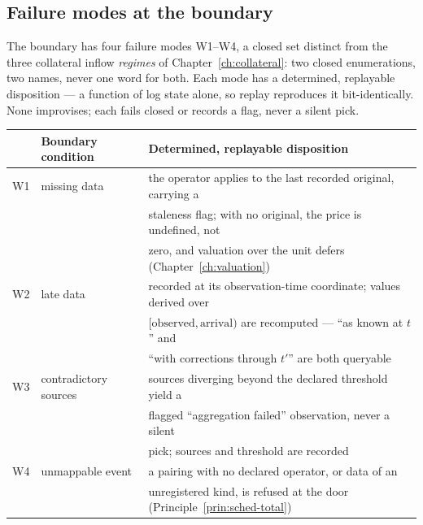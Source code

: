 \subsection{Failure modes at the boundary}\label{sec:failures}

The boundary has four failure modes W1--W4, a closed set distinct from the three collateral
inflow \emph{regimes} of Chapter~\ref{ch:collateral}: two closed enumerations, two names, never
one word for both. Each mode has a determined, replayable disposition --- a
function of log state alone, so replay reproduces it bit-identically. None improvises; each
fails closed or records a flag, never a silent pick.

\begin{center}
\begin{tabular}{@{}lll@{}}
\toprule
 & Boundary condition & Determined, replayable disposition \\
\midrule
W1 & missing data & the operator applies to the last recorded original, carrying a \\
   &               & staleness flag; with no original, the price is undefined, not \\
   &               & zero, and valuation over the unit defers (Chapter~\ref{ch:valuation}) \\
W2 & late data & recorded at its observation-time coordinate; values derived over \\
   &            & $[\text{observed},\text{arrival})$ are recomputed --- ``as known at $t$'' and \\
   &            & ``with corrections through $t'$'' are both queryable \\
W3 & contradictory sources & sources diverging beyond the declared threshold yield a \\
   &                       & flagged ``aggregation failed'' observation, never a silent \\
   &                       & pick; sources and threshold are recorded \\
W4 & unmappable event & a pairing with no declared operator, or data of an \\
   &                  & unregistered kind, is refused at the door (Principle~\ref{prin:sched-total}) \\
\bottomrule
\end{tabular}
\end{center}


